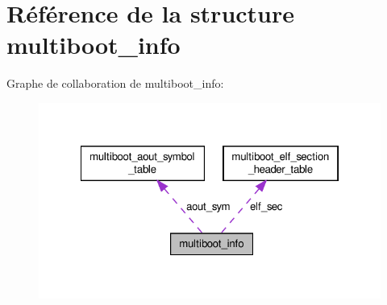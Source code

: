 \hypertarget{structmultiboot__info}{\section{Référence de la structure multiboot\-\_\-info}
\label{structmultiboot__info}
}


Graphe de collaboration de multiboot\-\_\-info\-:\nopagebreak
\begin{figure}[H]
\begin{center}
\leavevmode
\includegraphics[width=322pt]{structmultiboot__info__coll__graph}
\end{center}
\end{figure}
